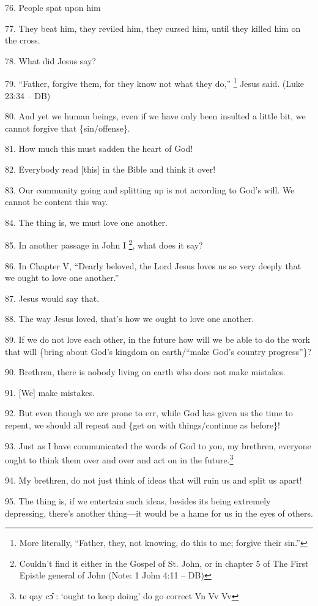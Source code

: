 76. People spat upon him

77. They beat him, they reviled him, they cursed him, until they killed him on
the cross.

78. What did Jesus say?

79. ``Father, forgive them, for they know not what they do,'' \footnote{More literally, ``Father, they, not knowing, do this to me; forgive their sin.''} Jesus said. (Luke
23:34 -- DB)

80. And yet we human beings, even if we have only been insulted a little bit, we
cannot forgive that \{sin/offense\}.

81. How much this must sadden the heart of God!

82. Everybody read [this] in the Bible and think it over!

83. Our community going and splitting up is not according to God's will. We cannot
be content this way.

84. The thing is, we must love one another.

85. In another passage in John I \footnote{Couldn't find it either in the Gospel of St. John, or in chapter 5 of The First Epistle general of John (Note: 1 John 4:11 -- DB)}, what does it say?

86. In Chapter V, ``Dearly beloved, the Lord Jesus loves us so very deeply that
we ought to love one another.''

87. Jesus would say that.

88. The way Jesus loved, that's how we ought to love one another.

89. If we do not love each other, in the future how will we be able to do the work
that will \{bring about God's kingdom on earth/``make God's country progress''\}?

90. Brethren, there is nobody living on earth who does not make mistakes.

91. [We] make mistakes.

92. But even though we are prone to err, while God has given us the time to repent,
we should all repeat and \{get on with things/continue as before\}!

93. Just as I have communicated the words of God to you, my brethren, everyone
ought to think them over and over and act on in the future.\footnote{te qay cɔ̂ : `ought to keep doing'  do go correct  Vn Vv Vv}

94. My brethren, do not just think of ideas that will ruin us and split us apart!

95. The thing is, if we entertain such ideas, besides its being extremely depressing,
there's another thing---it would be a hame for us in the eyes of others.


